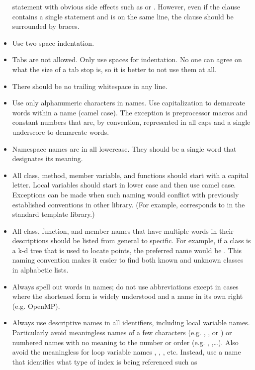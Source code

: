 \begin{itemize}
  statement with obvious side effects such as  or
  . However, even if the clause contains a single statement
  and is on the same line, the clause should be surrounded by braces.
\item Use two space indentation.
\item Tabs are not allowed. Only use spaces for indentation. No one can
  agree on what the size of a tab stop is, so it is better to not use them
  at all.
\item There should be no trailing whitespace in any line.
\item Use only alphanumeric characters in names. Use capitalization to
  demarcate words within a name (camel case). The exception is preprocessor
  macros and constant numbers that are, by convention, represented in all
  caps and a single underscore to demarcate words.
\item Namespace names are in all lowercase. They should be a single word
  that designates its meaning.
\item All class, method, member variable, and functions should start with a
  capital letter. Local variables should start in lower case and then use
  camel case. Exceptions can be made when such naming would conflict with
  previously established conventions in other library. (For example,
   corresponds to  in the
  standard template library.)
\item All class, function, and member names that have multiple words in
  their descriptions should be listed from general to specific. For
  example, if a class is a k-d tree that is used to locate points, the
  preferred name would be . This naming
  convention makes it easier to find both known and unknown classes in
  alphabetic lists.
\item Always spell out words in names; do not use abbreviations except in
  cases where the shortened form is widely understood and a name in its own
  right (e.g. OpenMP).
\item Always use descriptive names in all identifiers, including local
  variable names. Particularly avoid meaningless names of a few characters
  (e.g. , , or ) or numbered names
  with no meaning to the number or order (e.g. ,
  ,\ldots). Also avoid the meaningless for loop variable
  names , , , etc. Instead, use a name
  that identifies what type of index is being referenced such as

\end{itemize}
